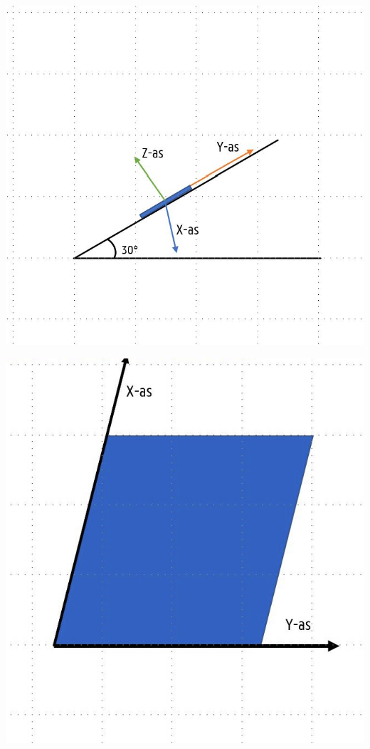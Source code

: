 \documentclass{article}
\begin{document}
\begin{minipage}{.35\textwidth}
  \centering
  \includegraphics[width=.7\linewidth]{figures/andereAfb/tafb.JPG}
 
  \label{fig:test2}
  \includegraphics[width=.7\linewidth]{figures/andereAfb/afb.jpg}

\end{minipage}
\end{document}
